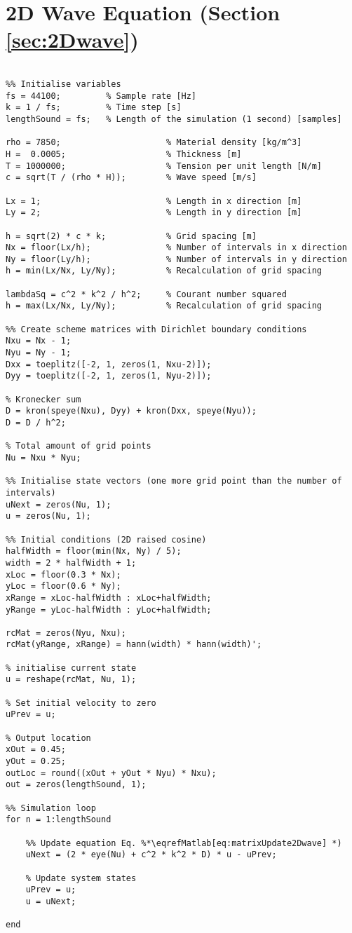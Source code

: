 \section{2D Wave Equation (Section \ref{sec:2Dwave})}
\label{app:2DWave}
\begin{lstlisting}

%% Initialise variables
fs = 44100;         % Sample rate [Hz]
k = 1 / fs;         % Time step [s]
lengthSound = fs;   % Length of the simulation (1 second) [samples]             

rho = 7850;                     % Material density [kg/m^3]
H =  0.0005;                    % Thickness [m]
T = 1000000;                    % Tension per unit length [N/m]
c = sqrt(T / (rho * H));        % Wave speed [m/s]

Lx = 1;                         % Length in x direction [m]
Ly = 2;                         % Length in y direction [m]

h = sqrt(2) * c * k;            % Grid spacing [m]
Nx = floor(Lx/h);               % Number of intervals in x direction
Ny = floor(Ly/h);               % Number of intervals in y direction
h = min(Lx/Nx, Ly/Ny);          % Recalculation of grid spacing

lambdaSq = c^2 * k^2 / h^2;     % Courant number squared
h = max(Lx/Nx, Ly/Ny);          % Recalculation of grid spacing

%% Create scheme matrices with Dirichlet boundary conditions 
Nxu = Nx - 1;
Nyu = Ny - 1;
Dxx = toeplitz([-2, 1, zeros(1, Nxu-2)]);
Dyy = toeplitz([-2, 1, zeros(1, Nyu-2)]);

% Kronecker sum
D = kron(speye(Nxu), Dyy) + kron(Dxx, speye(Nyu));
D = D / h^2;

% Total amount of grid points
Nu = Nxu * Nyu;
    
%% Initialise state vectors (one more grid point than the number of intervals)
uNext = zeros(Nu, 1); 
u = zeros(Nu, 1);

%% Initial conditions (2D raised cosine)
halfWidth = floor(min(Nx, Ny) / 5);
width = 2 * halfWidth + 1;
xLoc = floor(0.3 * Nx);
yLoc = floor(0.6 * Ny);
xRange = xLoc-halfWidth : xLoc+halfWidth;
yRange = yLoc-halfWidth : yLoc+halfWidth;

rcMat = zeros(Nyu, Nxu);
rcMat(yRange, xRange) = hann(width) * hann(width)';

% initialise current state  
u = reshape(rcMat, Nu, 1); 

% Set initial velocity to zero
uPrev = u;

% Output location
xOut = 0.45;
yOut = 0.25;
outLoc = round((xOut + yOut * Nyu) * Nxu);
out = zeros(lengthSound, 1);

%% Simulation loop
for n = 1:lengthSound
    
    %% Update equation Eq. %*\eqrefMatlab[eq:matrixUpdate2Dwave] *)
    uNext = (2 * eye(Nu) + c^2 * k^2 * D) * u - uPrev;
    
    % Update system states
    uPrev = u;
    u = uNext;
    
end
\end{lstlisting}
